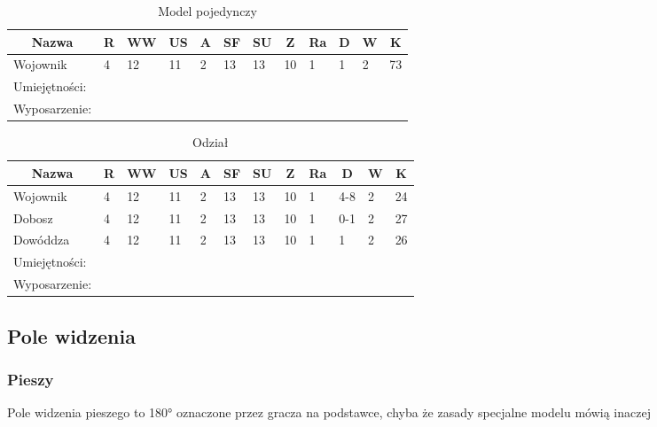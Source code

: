 
\begin{table}[h]
\caption{Model pojedynczy}

\begin{tabular}{|l|l|l|l|l|l|l|l|l|l|l|l|}
\hline
\multicolumn{1}{c}{Nazwa} & \multicolumn{1}{c}{R} & \multicolumn{1}{c}{WW} & \multicolumn{1}{c}{US} & \multicolumn{1}{c}{A} & \multicolumn{1}{c}{SF} & \multicolumn{1}{c}{SU} & \multicolumn{1}{c}{Z} & \multicolumn{1}{c}{Ra} & \multicolumn{1}{c}{D} & \multicolumn{1}{c}{W} & \multicolumn{1}{c}{K} \\ \hline
Wojownik & 4 & 12 & 11 & 2 & 13 & 13 & 10 & 1 & 1 & 2 & 73 \\ \hline
Umiejętności: \\ \hline
Wyposarzenie: \\ \hline
\end{tabular}

\end{table}

\begin{table}[h]
\caption{Odział}

\begin{tabular}{|l|l|l|l|l|l|l|l|l|l|l|l|}
\hline
\multicolumn{1}{c}{Nazwa} & \multicolumn{1}{c}{R} & \multicolumn{1}{c}{WW} & \multicolumn{1}{c}{US} & \multicolumn{1}{c}{A} & \multicolumn{1}{c}{SF} & \multicolumn{1}{c}{SU} & \multicolumn{1}{c}{Z} & \multicolumn{1}{c}{Ra} & \multicolumn{1}{c}{D} & \multicolumn{1}{c}{W} & \multicolumn{1}{c}{K} \\ \hline
Wojownik & 4 & 12 & 11 & 2 & 13 & 13 & 10 & 1 & 4-8 & 2 & 24  \\ \hline
Dobosz & 4 & 12 & 11 & 2 & 13 & 13 & 10 & 1 & 0-1 & 2 & 27 \\ \hline
Dowóddza & 4 & 12 & 11 & 2 & 13 & 13 & 10 & 1 & 1 & 2 & 26 \\ \hline
Umiejętności: \\ \hline
Wyposarzenie: \\ \hline
\end{tabular}

\end{table}

\subsection{Pole widzenia}

\subsubsection{Pieszy}
Pole widzenia pieszego to \ang{180} oznaczone przez gracza na podstawce, chyba że zasady specjalne modelu mówią inaczej

